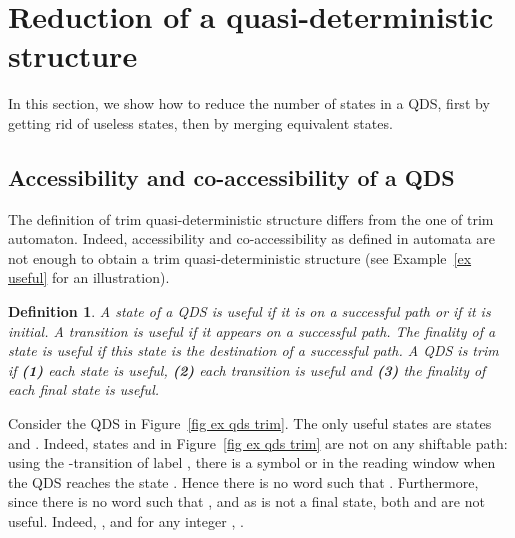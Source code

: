 \documentclass[11pt]{elsarticle}
\newtheorem{definition}{Definition}
\newcommand\modif[2]{{#2}}
\begin{document}
\section{Reduction of a quasi-deterministic structure}\label{sec qds}
\modif{}{In this section, we show how to reduce the number of states in a QDS, first by getting rid of  useless states, then by merging equivalent states.}
\subsection{Accessibility and co-accessibility of a QDS}
The definition of trim quasi-deterministic structure differs from the one of trim automaton. Indeed, accessibility and
co-accessibility as defined in automata are not enough 
to obtain
a trim quasi-deterministic structure (see Example~\ref{ex useful} for an illustration). 

\begin{definition}
\modif{}{A state of a QDS is useful if it is on a successful path or if it is initial. A transition is useful if it appears on a successful path. The finality of a state is useful if this state is the destination of a successful path. A QDS is trim if \textbf{(1)}  each state is useful, \textbf{(2)} each transition is useful and \textbf{(3)} the finality of each final state is useful.} 
\end{definition}

\begin{example}\label{ex useful}
  Consider the QDS \modif{}{} in Figure~\ref{fig ex qds trim}. The only useful states are states  and . Indeed, states  and  in Figure~\ref{fig ex qds trim} are not on any shiftable path: using the -transition of label , there is  a symbol  or  in the reading window when the QDS reaches the state . Hence there is no word  such that . Furthermore, since there is no word  such that , and as  is not a final state, both  and  are not useful.
\modif{}{Indeed, ,  and for any integer , .}
\end{example}  
\end{document}
